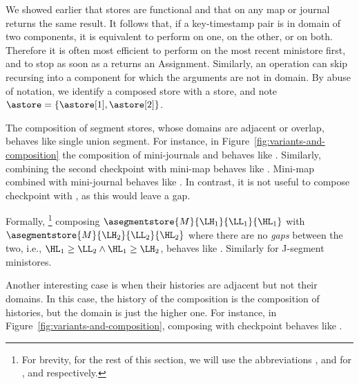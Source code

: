 We showed earlier that stores are functional and that \lookup{} on any
map or journal returns the same result.
It follows that, if a key-timestamp pair is in domain of two components,
it is equivalent to perform \lookup{} on one, on the other, or on both.
Therefore it is often most efficient to perform \lookup{} on the most
recent ministore first, and to stop as soon as a \lookup{} returns an
Assignment.
Similarly, an operation can skip recursing into a component for which
the arguments are not in domain.
By abuse of notation, we identify a composed store with a store, and
note $\astore = \{ \astore[1], \astore[2] \}$.

The composition of segment stores, whose domains are adjacent or
overlap, behaves like single union segment.
For instance, in Figure~\ref{fig:variants-and-composition} the
composition of mini-journals  and
 behaves like .
Similarly, combining the second checkpoint  with mini-map
 behaves like .
Mini-map  combined with
mini-journal  behaves like
.
In contrast, it is not useful to compose checkpoint
 with , as this
would leave a gap.

Formally,%
%
\footnote{
  For brevity, for the rest of this section, we will use
  the abbreviations \LH{}, \LL{} and \HL{} for \lowhistory{}, \lowlookup{}
  and \highlookup{} respectively.
}
%
composing
$\asegmentstore{M}{\LH_{1}}{\LL_{1}}{\HL_{1}}$
with
$\asegmentstore{M}{\LH_{2}}{\LL_{2}}{\HL_{2}}$
where there are no \emph{gaps} between the two, i.e., $\HL_{1}
\ge \LL_{2} \land \HL_{1} \ge \LH_{2}$, behaves
like
.
Similarly for J-segment ministores.

Another interesting case is when their histories are adjacent but not
their domains.
In this case, the history of the composition is the composition of
histories, but the domain is just the higher one.
For instance, in Figure~\ref{fig:variants-and-composition}, composing
 with checkpoint 
behaves like .

